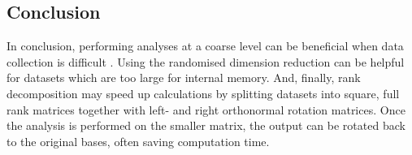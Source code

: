 \documentclass[ijgi,article,submit,moreauthors,pdftex,10pt,a4paper]{Definitions/mdpi}
\begin{document}
\subsection{Conclusion}
\label{sec:Discussion/Conclusion}

In conclusion, performing analyses at a coarse level can be beneficial when data collection is difficult%
. Using the randomised dimension reduction can be helpful for datasets which are too large for internal memory. And, finally, rank decomposition may speed up calculations by splitting datasets into square, full rank matrices together with left- and right orthonormal rotation matrices. Once the analysis is performed on the smaller matrix, the output can be rotated back to the original bases, often saving computation time.




\vspace{6pt} 



\end{document}
